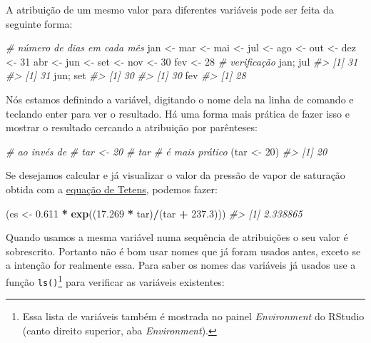 \documentclass[]{book}
\newenvironment{Shaded}{\begin{snugshade}}{\end{snugshade}}
\newcommand{\KeywordTok}[1]{\textcolor[rgb]{0.13,0.29,0.53}{\textbf{#1}}}
\newcommand{\DecValTok}[1]{\textcolor[rgb]{0.00,0.00,0.81}{#1}}
\newcommand{\FloatTok}[1]{\textcolor[rgb]{0.00,0.00,0.81}{#1}}
\newcommand{\StringTok}[1]{\textcolor[rgb]{0.31,0.60,0.02}{#1}}
\newcommand{\CommentTok}[1]{\textcolor[rgb]{0.56,0.35,0.01}{\textit{#1}}}
\newcommand{\OperatorTok}[1]{\textcolor[rgb]{0.81,0.36,0.00}{\textbf{#1}}}
\newcommand{\NormalTok}[1]{#1}
\let\rmarkdownfootnote\footnote%
\def\footnote{\protect\rmarkdownfootnote}
\begin{document}
A atribuição de um mesmo valor para diferentes variáveis pode ser feita
da seguinte forma:

\begin{Shaded}
\begin{Highlighting}[]
\CommentTok{# número de dias em cada mês}
\NormalTok{jan <-}\StringTok{ }\NormalTok{mar <-}\StringTok{ }\NormalTok{mai <-}\StringTok{ }\NormalTok{jul <-}\StringTok{ }\NormalTok{ago <-}\StringTok{ }\NormalTok{out <-}\StringTok{ }\NormalTok{dez <-}\StringTok{ }\DecValTok{31}
\NormalTok{abr <-}\StringTok{ }\NormalTok{jun <-}\StringTok{ }\NormalTok{set <-}\StringTok{ }\NormalTok{nov <-}\StringTok{ }\DecValTok{30}
\NormalTok{fev <-}\StringTok{ }\DecValTok{28}
\CommentTok{# verificação}
\NormalTok{jan; jul}
\CommentTok{#> [1] 31}
\CommentTok{#> [1] 31}
\NormalTok{jun; set}
\CommentTok{#> [1] 30}
\CommentTok{#> [1] 30}
\NormalTok{fev}
\CommentTok{#> [1] 28}
\end{Highlighting}
\end{Shaded}

Nós estamos definindo a variável, digitando o nome dela na linha de
comando e teclando enter para ver o resultado. Há uma forma mais prática
de fazer isso e mostrar o resultado cercando a atribuição por
parênteses:

\begin{Shaded}
\begin{Highlighting}[]
\CommentTok{# ao invés de }
\CommentTok{# tar <- 20}
\CommentTok{# tar}
\CommentTok{# é mais prático}
\NormalTok{(tar <-}\StringTok{ }\DecValTok{20}\NormalTok{) }
\CommentTok{#> [1] 20}
\end{Highlighting}
\end{Shaded}

Se desejamos calcular e já visualizar o valor da pressão de vapor de
saturação obtida com a
\href{https://en.wikipedia.org/wiki/Tetens_equation}{equação de Tetens},
podemos fazer:

\begin{Shaded}
\begin{Highlighting}[]
\NormalTok{(es <-}\StringTok{ }\FloatTok{0.611} \OperatorTok{*}\StringTok{ }\KeywordTok{exp}\NormalTok{((}\FloatTok{17.269} \OperatorTok{*}\StringTok{ }\NormalTok{tar)}\OperatorTok{/}\NormalTok{(tar }\OperatorTok{+}\StringTok{ }\FloatTok{237.3}\NormalTok{)))}
\CommentTok{#> [1] 2.338865}
\end{Highlighting}
\end{Shaded}

Quando usamos a mesma variável numa sequência de atribuições o seu valor
é sobrescrito. Portanto não é bom usar nomes que já foram usados antes,
exceto se a intenção for realmente essa. Para saber os nomes das
variáveis já usados use a função \texttt{ls()}\footnote{Essa lista de
  variáveis também é mostrada no painel \emph{Environment} do RStudio
  (canto direito superior, aba \emph{Environment}).} para verificar as
variáveis existentes:
\end{document}
